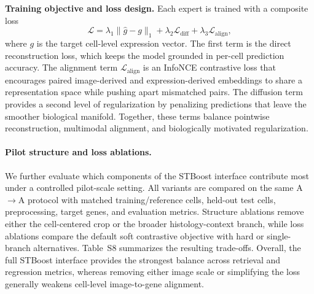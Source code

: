 \documentclass{article}
\begin{document}
\noindent\textbf{Training objective and loss design.}
Each expert is trained with a composite loss
\begin{equation}
\mathcal{L}=\lambda_1\|\hat{g}-g\|_1 + \lambda_2\mathcal{L}_{\mathrm{diff}} + \lambda_3\mathcal{L}_{\mathrm{align}},
\end{equation}
where $g$ is the target cell-level expression vector. The first term is the direct reconstruction loss, which keeps the model grounded in per-cell prediction accuracy. The alignment term $\mathcal{L}_{\mathrm{align}}$ is an InfoNCE contrastive loss that encourages paired image-derived and expression-derived embeddings to share a representation space while pushing apart mismatched pairs. The diffusion term provides a second level of regularization by penalizing predictions that leave the smoother biological manifold. Together, these terms balance pointwise reconstruction, multimodal alignment, and biologically motivated regularization.

\paragraph{Pilot structure and loss ablations.}
We further evaluate which components of the STBoost interface contribute most under a controlled pilot-scale setting. All variants are compared on the same A$\to$A protocol with matched training/reference cells, held-out test cells, preprocessing, target genes, and evaluation metrics. Structure ablations remove either the cell-centered crop or the broader histology-context branch, while loss ablations compare the default soft contrastive objective with hard or single-branch alternatives. Table~S8 summarizes the resulting trade-offs. Overall, the full STBoost interface provides the strongest balance across retrieval and regression metrics, whereas removing either image scale or simplifying the loss generally weakens cell-level image-to-gene alignment.
\end{document}

